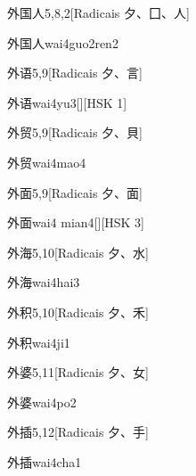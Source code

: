 \begin{entry}{外国人}{5,8,2}[Radicais ⼣、⼞、⼈]
  \begin{phonetics}{外国人}{wai4guo2ren2}
  \end{phonetics}
\end{entry}

\begin{entry}{外语}{5,9}[Radicais ⼣、⾔]
  \begin{phonetics}{外语}{wai4yu3}[][HSK 1]
  \end{phonetics}
\end{entry}

\begin{entry}{外贸}{5,9}[Radicais ⼣、⾙]
  \begin{phonetics}{外贸}{wai4mao4}
  \end{phonetics}
\end{entry}

\begin{entry}{外面}{5,9}[Radicais ⼣、⾯]
  \begin{phonetics}{外面}{wai4 mian4}[][HSK 3]
  \end{phonetics}
\end{entry}

\begin{entry}{外海}{5,10}[Radicais ⼣、⽔]
  \begin{phonetics}{外海}{wai4hai3}
  \end{phonetics}
\end{entry}

\begin{entry}{外积}{5,10}[Radicais ⼣、⽲]
  \begin{phonetics}{外积}{wai4ji1}
  \end{phonetics}
\end{entry}

\begin{entry}{外婆}{5,11}[Radicais ⼣、⼥]
  \begin{phonetics}{外婆}{wai4po2}
  \end{phonetics}
\end{entry}

\begin{entry}{外插}{5,12}[Radicais ⼣、⼿]
  \begin{phonetics}{外插}{wai4cha1}
  \end{phonetics}
\end{entry}

